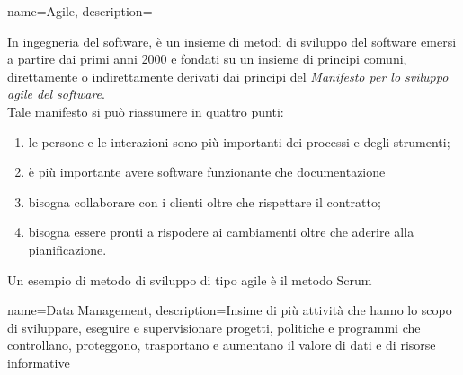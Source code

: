 
\renewcommand{\acronymname}{Acronimi e abbreviazioni}

{
	name=Agile,
	description={
		 In ingegneria del software, è un insieme di metodi di sviluppo del software emersi a partire dai primi anni 2000 e fondati su un insieme di principi comuni, direttamente o indirettamente derivati dai principi del \textit{Manifesto per lo sviluppo agile del software}\cite{manifestoAgile}.\\
		 Tale manifesto si può riassumere in quattro punti:
		 \begin{enumerate}
		 	\item le persone e le interazioni sono più importanti dei processi e degli strumenti;
		 	\item è più importante avere software funzionante che documentazione
		 	\item bisogna collaborare con i clienti oltre che rispettare il contratto;
		 	\item bisogna essere pronti a rispodere ai cambiamenti oltre che aderire alla pianificazione.
		 \end{enumerate}
		 Un esempio di metodo di sviluppo di tipo agile è il metodo \gls{Scrum}}
}
{
	name=Data Management,
	description={Insime di più attività che hanno lo scopo di sviluppare, eseguire e supervisionare progetti, politiche e programmi che controllano, proteggono, trasportano e aumentano il valore di dati e di risorse informative}
}
